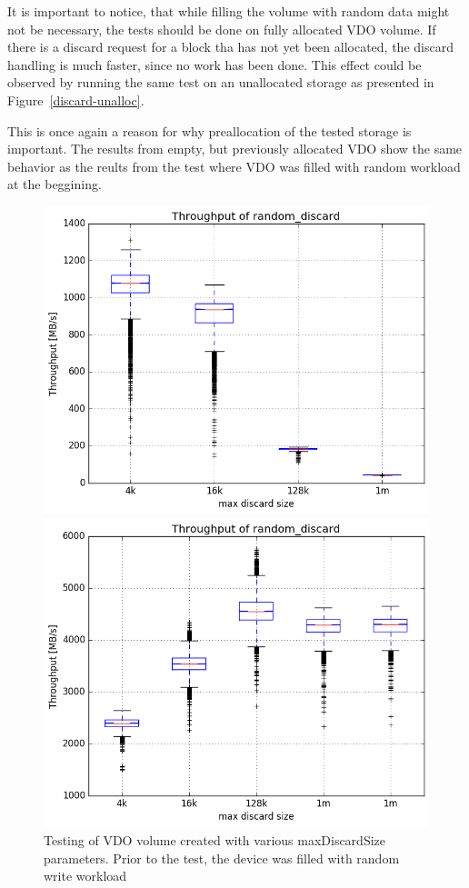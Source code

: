 \documentclass[
  color, %
  table, %
  lof,   %
  lot,   %
]{fithesis3}
\begin{document}
It is important to notice, that while filling the volume with random data might not be necessary, the tests should be done on fully allocated VDO volume. If there is a discard request for a block tha has not yet been allocated, the discard handling is much faster, since no work has been done. This effect could be observed by running the same test on an unallocated storage as presented in Figure~\ref{discard-unalloc}.

This is once again a reason for why preallocation of the tested storage is important. The results from empty, but previously allocated VDO show the same behavior as the reults from the test where VDO was filled with random workload at the beggining.


\begin{figure}[!htb]
        \centering
        \includegraphics[width=\textwidth]{../results/discards/full_VDO/report/random_discard1_compare_boxplots}
\caption[Discards]{Testing of VDO volume created with various maxDiscardSize parameters. Prior to the test, the device was filled with random write workload}
\label{fig:discard-full}
        \centering
        \includegraphics[width=\textwidth]{../results/discards/unalloc_VDO/report/random_discard1_compare_boxplots}

\end{figure}
\end{document}
